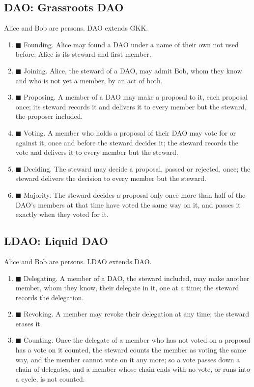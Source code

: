 \subsection*{DAO: Grassroots DAO}
\begin{contractbox}
Alice and Bob are persons.  DAO extends GKK.\par\smallskip
\begin{enumerate}[leftmargin=*]
\item $\blacksquare$ Founding.  Alice may found a DAO under a name of their own not used before; Alice is its steward and first member.
\item $\blacksquare$ Joining.  Alice, the steward of a DAO, may admit Bob, whom they know and who is not yet a member, by an act of both.
\item $\blacksquare$ Proposing.  A member of a DAO may make a proposal to it, each proposal once; its steward records it and delivers it to every member but the steward, the proposer included.
\item $\blacksquare$ Voting.  A member who holds a proposal of their DAO may vote for or against it, once and before the steward decides it; the steward records the vote and delivers it to every member but the steward.
\item $\blacksquare$ Deciding.  The steward may decide a proposal, passed or rejected, once; the steward delivers the decision to every member but the steward.
\item $\blacksquare$ Majority.  The steward decides a proposal only once more than half of the DAO's members at that time have voted the same way on it, and passes it exactly when they voted for it.
\end{enumerate}
\end{contractbox}

\subsection*{LDAO: Liquid DAO}
\begin{contractbox}
Alice and Bob are persons.  LDAO extends DAO.\par\smallskip
\begin{enumerate}[leftmargin=*]
\item $\blacksquare$ Delegating.  A member of a DAO, the steward included, may make another member, whom they know, their delegate in it, one at a time; the steward records the delegation.
\item $\blacksquare$ Revoking.  A member may revoke their delegation at any time; the steward erases it.
\item $\blacksquare$ Counting.  Once the delegate of a member who has not voted on a proposal has a vote on it counted, the steward counts the member as voting the same way, and the member cannot vote on it any more; so a vote passes down a chain of delegates, and a member whose chain ends with no vote, or runs into a cycle, is not counted.
\end{enumerate}
\end{contractbox}


